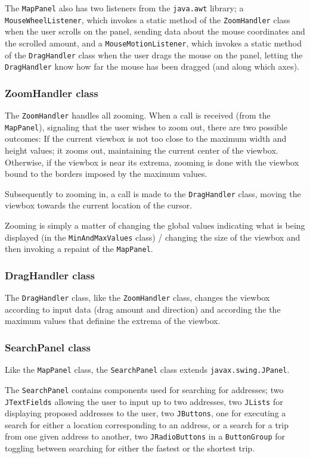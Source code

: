 The \texttt{MapPanel} also has two listeners from the \texttt{java.awt} library; a \\\texttt{MouseWheelListener}, which invokes a static method of the \texttt{ZoomHandler} class when the user scrolls on the panel, sending data about the mouse coordinates and the scrolled amount, and a \texttt{MouseMotionListener}, which invokes a static method of the \texttt{DragHandler} class when the user drags the mouse on the panel, letting the \texttt{DragHandler} know how far the mouse has been dragged (and along which axes).

\subsubsection{ZoomHandler class} %
The \texttt{ZoomHandler} handles all zooming. When a call is received (from the \texttt{MapPanel}), signaling that the user wishes to zoom out, there are two possible outcomes: If the current viewbox is not too close to the maximum width and height values; it zooms out, maintaining the current center of the viewbox. Otherwise, if the viewbox is near its extrema, zooming is done with the viewbox bound to the borders imposed by the maximum values.

Subsequently to zooming in, a call is made to the \texttt{DragHandler} class, moving the viewbox towards the current location of the cursor.

Zooming is simply a matter of changing the global values indicating what is being displayed (in the \texttt{MinAndMaxValues} class) / changing the size of the viewbox and then invoking a repaint of the \texttt{MapPanel}.

\subsubsection{DragHandler class} %
The \texttt{DragHandler} class, like the \texttt{ZoomHandler} class, changes the viewbox according to input data (drag amount and direction) and according the the maximum values that definine the extrema of the viewbox.

\subsubsection{SearchPanel class}
Like the \texttt{MapPanel} class, the \texttt{SearchPanel} class extends \texttt{javax.swing.JPanel}.

The \texttt{SearchPanel} contains components used for searching for addresses; two \texttt{JTextFields} allowing the user to input up to two addresses, two \texttt{JLists} for displaying proposed addresses to the user, two \texttt{JButtons}, one for executing a search for either a location corresponding to an address, or a search for a trip from one given address to another, two \texttt{JRadioButtons} in a \texttt{ButtonGroup} for toggling between searching for either the fastest or the shortest trip.

